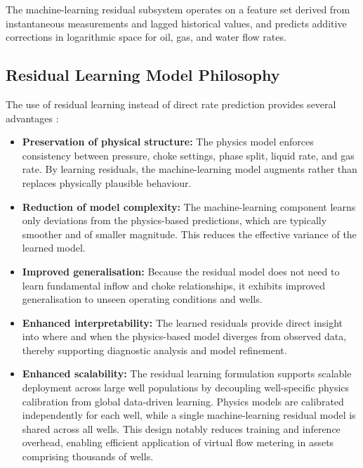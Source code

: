 \documentclass[12pt,APA]{uomthesis}
\begin{document}
The machine-learning residual subsystem operates on a feature set derived from instantaneous measurements and lagged historical values, and predicts additive corrections in logarithmic space for oil, gas, and water flow rates.


\subsection{Residual Learning Model Philosophy}
\label{subsec:residual_learning_model_philosophy}
The use of residual learning instead of direct rate prediction provides several advantages \citep{he2016deep}:

\begin{itemize}
    \item \textbf{Preservation of physical structure:}  
          The physics model enforces consistency between pressure, choke settings,
          phase split, liquid rate, and gas rate. By learning residuals, the machine-learning
          model augments rather than replaces physically plausible behaviour.

    \item \textbf{Reduction of model complexity:}  
          The machine-learning component learns only deviations from the physics-based
          predictions, which are typically smoother and of smaller magnitude. This reduces
          the effective variance of the learned model.

    \item \textbf{Improved generalisation:}  
          Because the residual model does not need to learn fundamental inflow and choke
          relationships, it exhibits improved generalisation to unseen operating conditions
          and wells.

    \item \textbf{Enhanced interpretability:}  
          The learned residuals provide direct insight into where and when the physics-based
          model diverges from observed data, thereby supporting diagnostic analysis and model
          refinement.

    \item \textbf{Enhanced scalability:}  
        The residual learning formulation supports scalable deployment across large well
        populations by decoupling well-specific physics calibration from global data-driven
        learning. Physics models are calibrated independently for each well, while a single
        machine-learning residual model is shared across all wells. This design notably
        reduces training and inference overhead, enabling efficient application of virtual
        flow metering in assets comprising thousands of wells.


\end{itemize}
\end{document}
